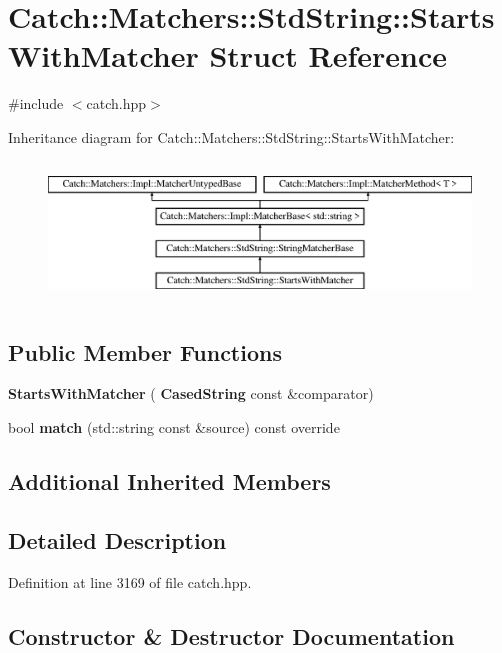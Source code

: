 \section{Catch\+::Matchers\+::Std\+String\+::Starts\+With\+Matcher Struct Reference}
\label{struct_catch_1_1_matchers_1_1_std_string_1_1_starts_with_matcher}


{\ttfamily \#include $<$catch.\+hpp$>$}

Inheritance diagram for Catch\+::Matchers\+::Std\+String\+::Starts\+With\+Matcher\+:\begin{figure}[H]
\begin{center}
\leavevmode
\includegraphics[height=3.758389cm]{struct_catch_1_1_matchers_1_1_std_string_1_1_starts_with_matcher}
\end{center}
\end{figure}
\subsection*{Public Member Functions}
\begin{DoxyCompactItemize}
\item 
\textbf{ Starts\+With\+Matcher} (\textbf{ Cased\+String} const \&comparator)
\item 
bool \textbf{ match} (std\+::string const \&source) const override
\end{DoxyCompactItemize}
\subsection*{Additional Inherited Members}


\subsection{Detailed Description}


Definition at line 3169 of file catch.\+hpp.



\subsection{Constructor \& Destructor Documentation}
\mbox{\label{struct_catch_1_1_matchers_1_1_std_string_1_1_starts_with_matcher_a7b86f258bdbd131a6e7bcd94a8977325}} 
